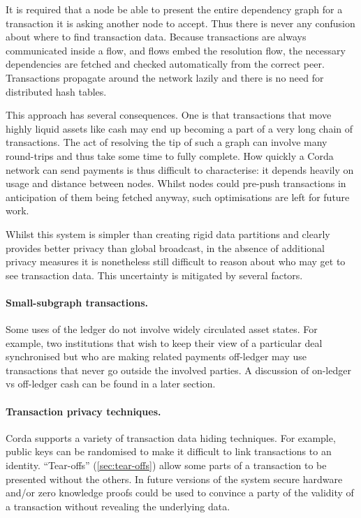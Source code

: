 \documentclass{article}
\begin{document}
It is required that a node be able to present the entire dependency graph for a transaction it is asking another
node to accept. Thus there is never any confusion about where to find transaction data. Because transactions are
always communicated inside a flow, and flows embed the resolution flow, the necessary dependencies are fetched
and checked automatically from the correct peer. Transactions propagate around the network lazily and there is
no need for distributed hash tables.

This approach has several consequences. One is that transactions that move highly liquid assets like cash may
end up becoming a part of a very long chain of transactions. The act of resolving the tip of such a graph can
involve many round-trips and thus take some time to fully complete. How quickly a Corda network can send payments
is thus difficult to characterise: it depends heavily on usage and distance between nodes. Whilst nodes could
pre-push transactions in anticipation of them being fetched anyway, such optimisations are left for future work.

Whilst this system is simpler than creating rigid data partitions and clearly provides better privacy than global
broadcast, in the absence of additional privacy measures it is nonetheless still difficult to reason about who
may get to see transaction data. This uncertainty is mitigated by several factors.

\paragraph{Small-subgraph transactions.}Some uses of the ledger do not involve widely circulated asset states.
For example, two institutions that wish to keep their view of a particular deal synchronised but who are making
related payments off-ledger may use transactions that never go outside the involved parties. A discussion of
on-ledger vs off-ledger cash can be found in a later section.

\paragraph{Transaction privacy techniques.}Corda supports a variety of transaction data hiding techniques. For
example, public keys can be randomised to make it difficult to link transactions to an identity. ``Tear-offs'' (\cref{sec:tear-offs})
allow some parts of a transaction to be presented without the others. In future versions of the system secure hardware
and/or zero knowledge proofs could be used to convince a party of the validity of a transaction without revealing the
underlying data.
\end{document}
